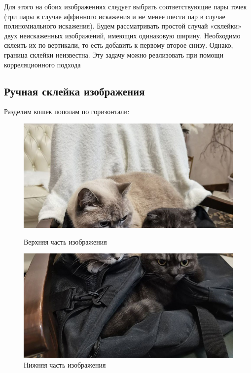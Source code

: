 \documentclass[a4paper, 16pt]{article}
\begin{document}
\noindent Для этого на обоих изображениях следует
выбрать соответствующие пары точек (три пары в случае
аффинного искажения и не менее шести пар в случае полиномиального искажения).
Будем рассматривать простой случай «склейки» двух неискаженных изображений,
имеющих одинаковую ширину. Необходимо склеить их по вертикали, то есть
добавить к первому второе снизу. Однако, граница склейки неизвестна.
Эту задачу можно реализовать при помощи корреляционного подхода


\subsection{Ручная склейка изображения}
\noindent Разделим кошек пополам по горизонтали:
\begin{figure}[!htb]
    \centering
    \begin{minipage}{0.45\textwidth}
        \centering
        \includegraphics[scale=0.3]{top.jpg}
        \captionsetup{skip=0pt}
        \caption{Верхняя часть изображения}
        \label{Рис:22}
    \end{minipage}
    \begin{minipage}{0.45\textwidth}
        \centering
        \includegraphics[scale=0.3]{bot.jpg}
        \captionsetup{skip=0pt}
        \caption{Нижняя часть изображения}
        \label{Рис:23}
    \end{minipage}
\end{figure}
\end{document}
